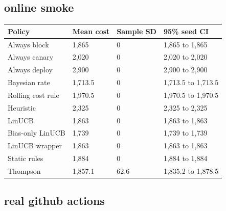 \documentclass[
  10pt,
]{article}
\begin{document}
\subsection{online smoke}\label{online-smoke}

\par\medskip\noindent\begin{minipage}{\linewidth}\centering
\begin{tabular}{@{}llll@{}}
\toprule\noalign{}
Policy & Mean cost & Sample SD & 95\% seed CI \\
\midrule\noalign{}
Always block & 1,865 & 0 & 1,865 to 1,865 \\
Always canary & 2,020 & 0 & 2,020 to 2,020 \\
Always deploy & 2,900 & 0 & 2,900 to 2,900 \\
Bayesian rate & 1,713.5 & 0 & 1,713.5 to 1,713.5 \\
Rolling cost rule & 1,970.5 & 0 & 1,970.5 to 1,970.5 \\
Heuristic & 2,325 & 0 & 2,325 to 2,325 \\
LinUCB & 1,863 & 0 & 1,863 to 1,863 \\
Bias-only LinUCB & 1,739 & 0 & 1,739 to 1,739 \\
LinUCB wrapper & 1,863 & 0 & 1,863 to 1,863 \\
Static rules & 1,884 & 0 & 1,884 to 1,884 \\
Thompson & 1,857.1 & 62.6 & 1,835.2 to 1,878.5 \\
\bottomrule
\end{tabular}
\end{minipage}\par\medskip

\subsection{real github actions}\label{real-github-actions}
\end{document}
